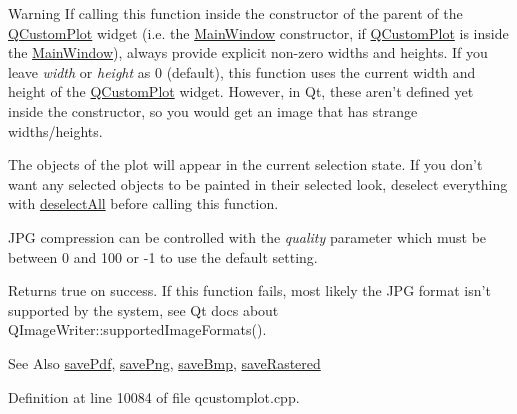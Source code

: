 \begin{DoxyWarning}{Warning}
If calling this function inside the constructor of the parent of the \hyperlink{class_q_custom_plot}{Q\-Custom\-Plot} widget (i.\-e. the \hyperlink{class_main_window}{Main\-Window} constructor, if \hyperlink{class_q_custom_plot}{Q\-Custom\-Plot} is inside the \hyperlink{class_main_window}{Main\-Window}), always provide explicit non-\/zero widths and heights. If you leave {\itshape width} or {\itshape height} as 0 (default), this function uses the current width and height of the \hyperlink{class_q_custom_plot}{Q\-Custom\-Plot} widget. However, in Qt, these aren't defined yet inside the constructor, so you would get an image that has strange widths/heights.
\end{DoxyWarning}
The objects of the plot will appear in the current selection state. If you don't want any selected objects to be painted in their selected look, deselect everything with \hyperlink{class_q_custom_plot_a9d4808ab925b003054085246c92a257c}{deselect\-All} before calling this function.

J\-P\-G compression can be controlled with the {\itshape quality} parameter which must be between 0 and 100 or -\/1 to use the default setting.

Returns true on success. If this function fails, most likely the J\-P\-G format isn't supported by the system, see Qt docs about Q\-Image\-Writer\-::supported\-Image\-Formats().

\begin{DoxySeeAlso}{See Also}
\hyperlink{class_q_custom_plot_a84e33ad7492180f20ff520e557ed102d}{save\-Pdf}, \hyperlink{class_q_custom_plot_a7636261aff1f6d25c9da749ece3fc8b8}{save\-Png}, \hyperlink{class_q_custom_plot_a6629d9e8e6da4bf18055ee0257fdce9a}{save\-Bmp}, \hyperlink{class_q_custom_plot_ab528b84cf92baabe29b1d0ef2f77c93e}{save\-Rastered} 
\end{DoxySeeAlso}


Definition at line 10084 of file qcustomplot.\-cpp.

